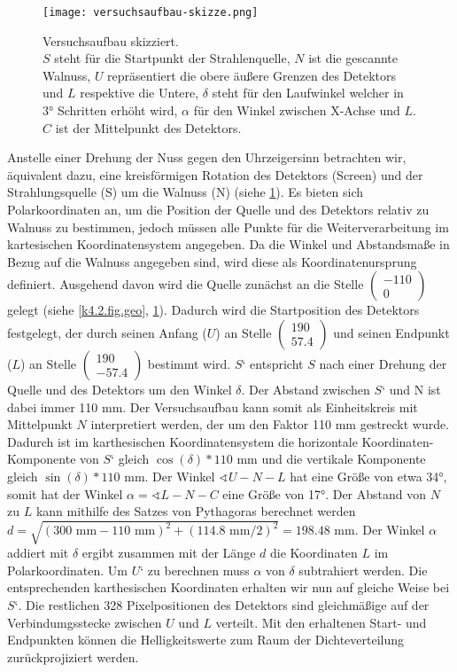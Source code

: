 \begin{figure}
	\centering
	\texttt{[image: versuchsaufbau-skizze.png]}
	\caption{Versuchsaufbau skizziert. \\
	$S$ steht für die Startpunkt der Strahlenquelle, $N$ ist die gescannte Walnuss, $U$ repräsentiert die obere äußere Grenzen des Detektors und $L$ respektive die Untere, $\delta$ steht für den Laufwinkel welcher in 3° Schritten erhöht wird, $\alpha$ für den Winkel zwischen X-Achse und $L$. $C$ ist der Mittelpunkt des Detektors.
	}
	\label{k4.2.fig.skizze}
\end{figure}

Anstelle einer Drehung der Nuss gegen den Uhrzeigersinn betrachten wir, äquivalent dazu, eine kreisförmigen Rotation des Detektors (Screen) und der Strahlungsquelle (S) um die Walnuss (N) (siehe \cref{k4.2.fig.skizze}). Es bieten sich Polarkoordinaten an, um die Position der Quelle und des Detektors relativ zu Walnuss zu bestimmen, jedoch müssen alle Punkte für die Weiterverarbeitung im kartesischen Koordinatensystem angegeben. Da die Winkel und Abstandsmaße in Bezug auf die Walnuss angegeben sind, wird diese als Koordinatenursprung definiert. Ausgehend davon wird die Quelle zunächst an die Stelle $\begin{pmatrix}-110\\ 0 \end{pmatrix}$   gelegt (siehe \cref{k4.2.fig.geo}, \cref{k4.2.fig.skizze}). Dadurch wird die Startposition des Detektors festgelegt, der durch seinen Anfang ($U$) an Stelle $\begin{pmatrix}190\\ 57.4 \end{pmatrix}$ und seinen Endpunkt ($L$) an Stelle $\begin{pmatrix}190\\ -57.4 \end{pmatrix}$ bestimmt wird. 
$S‘$ entspricht $S$ nach einer Drehung der Quelle und des Detektors um den Winkel $\delta$. Der Abstand zwischen $S‘$ und $\mathrm{N}$ ist dabei immer 110 mm. Der Versuchsaufbau kann somit als Einheitskreis mit Mittelpunkt $N$ interpretiert werden, der um den Faktor 110 mm gestreckt wurde. Dadurch ist im karthesischen Koordinatensystem die horizontale Koordinaten-Komponente von $S‘$ gleich $\cos(\delta) * 110\text{ mm}$ und die vertikale Komponente gleich $\sin(\delta) * 110\text{ mm}$.
Der Winkel $\sphericalangle U-N-L$ hat eine Größe von etwa 34°, somit hat der Winkel $\alpha = \sphericalangle L-N-C$ eine Größe von 17°. Der Abstand von $N$ zu $L$ kann mithilfe des Satzes von Pythagoras berechnet werden $d = \sqrt{(300\text{ mm} - 110\text{ mm})^2+(114.8\text{ mm}/2)^2} = 198.48\text{ mm}$.
Der Winkel $\alpha$ addiert mit $\delta$ ergibt zusammen mit der Länge $d$ die Koordinaten $L$ im Polarkoordinaten. Um $U‘$ zu berechnen muss $\alpha$ von $\delta$ subtrahiert werden. Die entsprechenden karthesischen Koordinaten erhalten wir nun auf gleiche Weise bei $S‘$. Die restlichen 328 Pixelpositionen des Detektors sind gleichmäßige auf der Verbindumgsstecke zwischen $U$ und $L$ verteilt.
Mit den erhaltenen Start- und Endpunkten können die Helligkeitswerte zum Raum der Dichteverteilung zurückprojiziert werden.